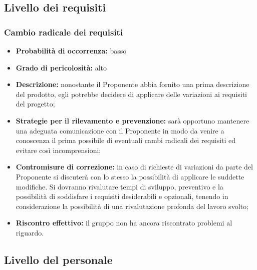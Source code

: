 \subsection{Livello dei requisiti}

\subsubsection{Cambio radicale dei requisiti}
\hypertarget{subsubsect:requisiti}{}
\begin{itemize}
\item \textbf{Probabilità di occorrenza:} basso
\item \textbf{Grado di pericolosità:} alto

\item \textbf{Descrizione:} nonostante il Proponente abbia fornito una prima descrizione del prodotto, egli potrebbe decidere di applicare delle variazioni ai requisiti del progetto;

\item \textbf{Strategie per il rilevamento e prevenzione:} sarà opportuno mantenere una adeguata comunicazione con il Proponente in modo da venire a conoscenza il prima possibile di eventuali cambi radicali dei requisiti ed evitare così incomprensioni;

\item \textbf{Contromisure di correzione:} in caso di richieste di variazioni da parte del Proponente si discuterà con lo stesso la possibilità di applicare le suddette modifiche. Si dovranno rivalutare tempi di sviluppo, preventivo e la possibilità di soddisfare i requisiti desiderabili e opzionali, tenendo in considerazione la possibilità di una rivalutazione profonda del lavoro svolto;

\item \textbf{Riscontro effettivo:} il gruppo non ha ancora riscontrato problemi al riguardo.
\end{itemize}

\subsection{Livello del personale}

